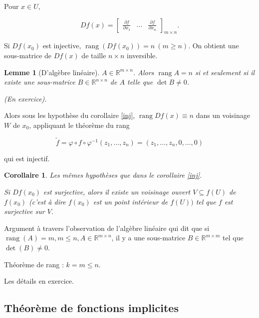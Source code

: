 \documentclass[french]{article}
\newtheorem*{lemma}{Lemme}
\newtheorem*{corollary}{Corollaire}
\begin{document}
Pour $x \in U,$

\[
Df(x) = \left[\begin{matrix}
  \frac{\partial f }{\partial x_1} & \dots & \frac{\partial f }{\partial x_n }
\end{matrix}\right] _{m \times n}.
\]

Si $Df(x_0)$ est injective, $\operatorname{rang}(Df(x_0)) = n \ (m \geq  n)$. On obtient une sous-matrice de $Df(x)$ de taille $n \times n$ inversible.

\begin{lemma}[D'algèbre linéaire]
  $A \in \mathbb{R} ^{m \times n}$. Alors $\operatorname{rang} A = n$ si et seulement si il existe une sous-matrice $B \in \mathbb{R} ^{n \times n}$ de $A$ telle que $\operatorname{det} B \neq 0$.



  (En exercice).
\end{lemma}

Alors sous les hypothèse du corollaire \ref{inj}, $\operatorname{rang}Df(x) \equiv n$ dans un voisinage $W$ de $x_0$, appliquant le théorème du rang

\[
\tilde{f} = \varphi \circ f \circ \varphi ^{-1} (z_1, \dots, z_n) = (z_1, \dots, z_n, 0, \dots, 0)
\]

qui est injectif.

\begin{corollary}
  Les mêmes hypothèses que dans le corollaire \ref{inj}.

  Si $Df(x_0)$ est surjective, alors il existe un voisinage ouvert $V \subseteq f(U)$ de $f(x_0)$ (c'est à dire $f(x_0)$ est un point intérieur de $f(U))$ tel que $f$ est surjective sur $V$.
\end{corollary}

Argument à travers l'observation de l'algèbre linéaire qui dit que si $\operatorname{rang}(A) = m, m \leq n, A \in \mathbb{R}^{m \times n}$, il  y a une sous-matrice $B \in \mathbb{R}^{m\times m}$ tel que $\operatorname{det}(B) \neq 0$.

Théorème de rang : $k=m \leq n$.

Les détails en exercice.

\subsection{Théorème de fonctions implicites}
\end{document}

